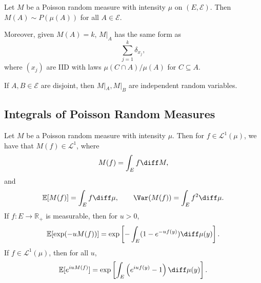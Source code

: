 \documentclass[12pt]{article}
\begin{document}
\begin{proposition}
	Let $M$ be a Poisson random measure with intensity $\mu$ on $(E, \mathcal{E})$. Then $M(A) \sim P(\mu(A))$ for all $A \in \mathcal{E}$.

	Moreover, given $M(A) = k$, $M|_{A}$ has the same form as
	\[
	\sum_{j = 1}^k \delta_{x_j},
	\]
	where $(x_j)$ are IID with laws $\mu(C \cap A)/\mu(A)$ for $C \subseteq A$.

	If $A, B \in \mathcal{E}$ are disjoint, then $M|_A, M|_B$ are independent random variables.
\end{proposition}

\subsection{Integrals of Poisson Random Measures}%
\label{sub:int_prm}

\begin{theorem}
	Let $M$ be a Poisson random measure with intensity $\mu$. Then for $f \in \mathcal{L}^1(\mu)$, we have that $M(f) \in \mathcal{L}^1$, where
	\[
	M(f) = \int_E f \diff M,
	\]
	and
	\[
	\mathbb{E}[M(f)] = \int_E f \diff \mu, \qquad \Var(M(f)) = \int_E f^2 \diff \mu.
	\]
	If $f : E \to \mathbb{R}_+$ is measurable, then for $u > 0$,
	\[
		\mathbb{E}[ \exp (-u M(f))] = \exp \left[ - \int_E (1 - e^{-u f(y)}) \diff \mu(y) \right].
	\]
	If $f \in \mathcal{L}^1(\mu)$, then for all $u$,
	\[
		\mathbb{E}[e^{i u M(f)}] = \exp \left[ \int_E \left( e^{i u f(y)} - 1 \right) \diff \mu(y) \right].
	\]
\end{theorem}
\end{document}

